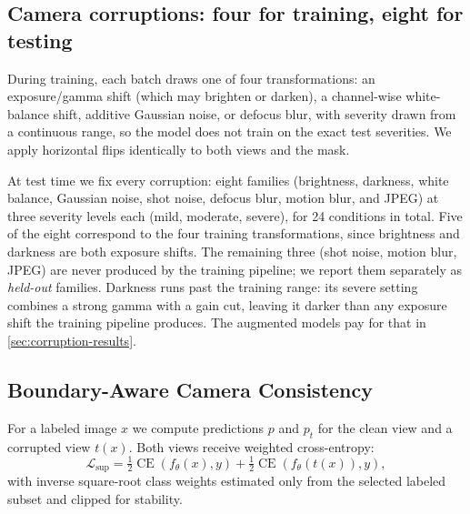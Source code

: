 \documentclass[runningheads]{llncs}
\begin{document}
\subsection{Camera corruptions: four for training, eight for testing}
\label{sec:corruptions}

During training, each batch draws one of four transformations: an
exposure/gamma shift (which may brighten or darken), a channel-wise
white-balance shift, additive Gaussian noise, or defocus blur, with severity
drawn from a continuous range, so the model does not train on the exact test
severities. We apply horizontal flips identically to both views and the mask.

At test time we fix every corruption: eight families (brightness, darkness,
white balance, Gaussian noise, shot noise, defocus blur, motion blur, and JPEG)
at three severity levels each (mild, moderate, severe), for 24 conditions in
total. Five of the eight correspond to the four training transformations,
since brightness and darkness are both exposure shifts. The remaining three
(shot noise, motion blur, JPEG) are never produced by the training pipeline;
we report them separately as \emph{held-out} families. Darkness runs past the training range: its
severe setting combines a strong gamma with a gain cut, leaving it darker than
any exposure shift the training pipeline produces. The augmented models pay
for that in \cref{sec:corruption-results}.

\subsection{Boundary-Aware Camera Consistency}

For a labeled image $x$ we compute predictions $p$ and $p_t$ for the clean
view and a corrupted view $t(x)$. Both views receive weighted cross-entropy:
\begin{equation}
\mathcal{L}_{\mathrm{sup}} = \tfrac{1}{2}\operatorname{CE}(f_\theta(x),y)
 + \tfrac{1}{2}\operatorname{CE}(f_\theta(t(x)),y),
\label{eq:sup}
\end{equation}
with inverse square-root class weights estimated only from the selected
labeled subset and clipped for stability.
\end{document}
